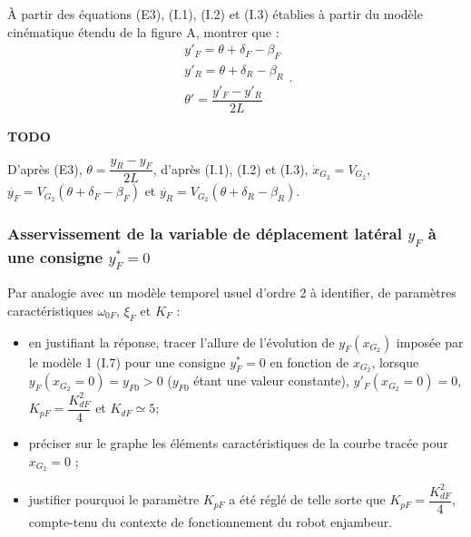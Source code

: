 \documentclass[11pt]{article}
\begin{document}
\UPSTIquestion À partir des équations (E3), (I.1), (I.2) et (I.3) établies à partir du modèle cinématique étendu de la
figure A, montrer que : 
$$ \begin{array}{l}
y'_F = \theta + \delta_F-\beta_F \\
y'_R = \theta + \delta_R-\beta_R \\
\theta'=\dfrac{y'_F-y'_R}{2L}
\end{array}.$$

\begin{UPSTIcorrige}

\textbf{TODO}


D'après (E3), $  \theta = \dfrac{ y_{R} - y_F}{2L } $, d'après  (I.1), (I.2) et (I.3), $\dot{x}_{G_2}=V_{G_2}$, $\dot{y_F}=V_{G_2}\left(\theta + \delta_F - \beta_F\right)$ et  $\dot{y_R}=V_{G_2}\left(\theta + \delta_R - \beta_R\right)$. 

\end{UPSTIcorrige}

\subsubsection{Asservissement de la variable de déplacement latéral $y_F$ à une consigne $y^*_F=0$}


\UPSTIquestion Par analogie avec un modèle temporel usuel d’ordre 2 à identifier, de paramètres caractéristiques $\omega_{0F}$, $\xi_F$ et $K_F$ :
\begin{itemize}
\item en justifiant la réponse, tracer l’allure de l’évolution de  $y_F\left(x_{G_2}\right)$  imposée par le modèle 1 (I.7) pour une consigne $y_F^*=0$ en fonction de $x_{G_2}$, lorsque $y_F\left(x_{G_2}=0\right)=y_{F0}>0$
 ($y_{F0}$ étant une valeur constante), $y'_F\left(x_{G_2}=0\right)=0$, $K_{pF}=\dfrac{K^2_{dF}}{4}$ et $K_{dF}\simeq 5$; 
 \item préciser sur le graphe les éléments caractéristiques de la courbe tracée pour $x_{G_2}=0$ ;
\item justifier pourquoi le paramètre $K_{pF}$ a été réglé de telle sorte que $K_{pF}=\dfrac{K^2_{dF}}{4}$, compte-tenu du contexte de fonctionnement du robot enjambeur.
\end{itemize}
\end{document}
